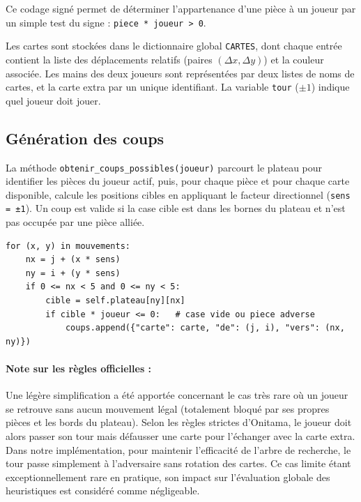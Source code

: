 \documentclass[12pt, a4paper]{article}
\begin{document}
Ce codage signé permet de déterminer l'appartenance d'une pièce à un joueur par un simple
test du signe : \texttt{piece * joueur > 0}.

Les cartes sont stockées dans le dictionnaire global \texttt{CARTES}, dont chaque entrée
contient la liste des déplacements relatifs (paires $(\Delta x, \Delta y)$) et la couleur
associée. Les mains des deux joueurs sont représentées par deux listes de noms de cartes, et
la carte extra par un unique identifiant. La variable \texttt{tour} ($\pm 1$) indique quel
joueur doit jouer.

\subsection{Génération des coups}

La méthode \texttt{obtenir\_coups\_possibles(joueur)} parcourt le plateau pour identifier les
pièces du joueur actif, puis, pour chaque pièce et pour chaque carte disponible, calcule les
positions cibles en appliquant le facteur directionnel (\texttt{sens = ±1}). Un coup est valide
si la case cible est dans les bornes du plateau et n'est pas occupée par une pièce alliée.

\begin{lstlisting}[caption={Extrait de la génération de coups légaux.}]
for (x, y) in mouvements:
    nx = j + (x * sens)
    ny = i + (y * sens)
    if 0 <= nx < 5 and 0 <= ny < 5:
        cible = self.plateau[ny][nx]
        if cible * joueur <= 0:   # case vide ou piece adverse
            coups.append({"carte": carte, "de": (j, i), "vers": (nx, ny)})
\end{lstlisting}

\paragraph{Note sur les règles officielles :} Une légère simplification a été apportée concernant 
le cas très rare où un joueur se retrouve sans aucun mouvement légal (totalement bloqué par 
ses propres pièces et les bords du plateau). Selon les règles strictes d'Onitama, le joueur 
doit alors passer son tour mais défausser une carte pour l'échanger avec la carte extra. 
Dans notre implémentation, pour maintenir l'efficacité de l'arbre de recherche, le tour passe 
simplement à l'adversaire sans rotation des cartes. Ce cas limite étant exceptionnellement 
rare en pratique, son impact sur l'évaluation globale des heuristiques est considéré comme négligeable.
\end{document}
